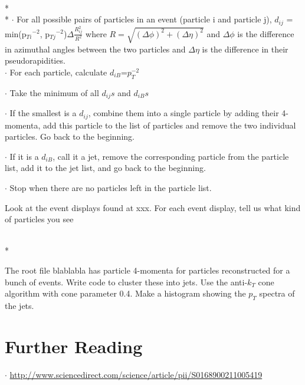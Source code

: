 \\*
\\*
$\cdot$ For all possible pairs of particles in an event (particle i and particle j), $d_{ij}$ = min(p$_{Ti}$$^{-2}$, p$_{Tj}$$^{-2}$)$\Delta\frac{R_{ij}^{2}}{R^{2}}$ where $R=\sqrt{(\Delta\phi)^{2}+(\Delta\eta)^{2}}$ and $\Delta\phi$ is the difference in azimuthal angles between the two particles and $\Delta\eta$ is the difference in their pseudorapidities.
\\
\noindent
$\cdot$ For each particle, calculate $d_{iB}$=$p_{T}^{-2}$

\noindent
$\cdot$ Take the minimum of all $d_{ij}s$ and $d_{iB}s$

\noindent
$\cdot$ If the smallest is a $d_{ij}$, combine them into a single particle by adding their 4-momenta, add this particle to the list of particles and remove the two individual particles.  Go back to the beginning.

\noindent 
$\cdot$ If it is a $d_{iB}$, call it a jet, remove the corresponding particle from the particle list, add it to the jet list, and go back to the beginning.

\noindent
$\cdot$ Stop when there are no particles left in the particle list.
\newpage
\noindent
\vspace{.2cm} 
\begin{minipage}{0.7\textwidth} 
\begin{framed}
\begin{exercise}
{Look at the event displays found at xxx. For each event display, tell us what kind of particles you see}
\end{exercise}
\end{framed} 
\end{minipage}
\vspace{.2cm}
\\*
\vspace{.2cm} 
\begin{minipage}{0.7\textwidth} 
\begin{framed}
\begin{exercise}
{The root file blablabla has particle 4-momenta for particles reconstructed for a bunch of events. Write code to cluster these into jets. Use the anti-$k_{T}$ cone algorithm with cone parameter 0.4. Make a histogram showing the $p_{T}$ spectra of the jets.}
\end{exercise}
\end{framed} 
\end{minipage}
\vspace{.2cm}

\section{Further Reading}
\noindent
$\cdot$ \url{http://www.sciencedirect.com/science/article/pii/S0168900211005419}
